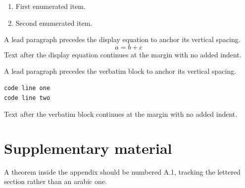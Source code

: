 \documentclass[acmsmall,nonacm]{acmart}
\begin{document}
\begin{enumerate}
\item First enumerated item.
\item Second enumerated item.
\end{enumerate}

A lead paragraph precedes the display equation to anchor its vertical spacing.
\begin{equation}
a = b + c
\end{equation}
Text after the display equation continues at the margin with no added indent.

A lead paragraph precedes the verbatim block to anchor its vertical spacing.
\begin{verbatim}
code line one
code line two
\end{verbatim}
Text after the verbatim block continues at the margin with no added indent.

\appendix
\section{Supplementary material}
\begin{theorem}
A theorem inside the appendix should be numbered A.1, tracking the lettered section rather than an arabic one.
\end{theorem}
\end{document}
